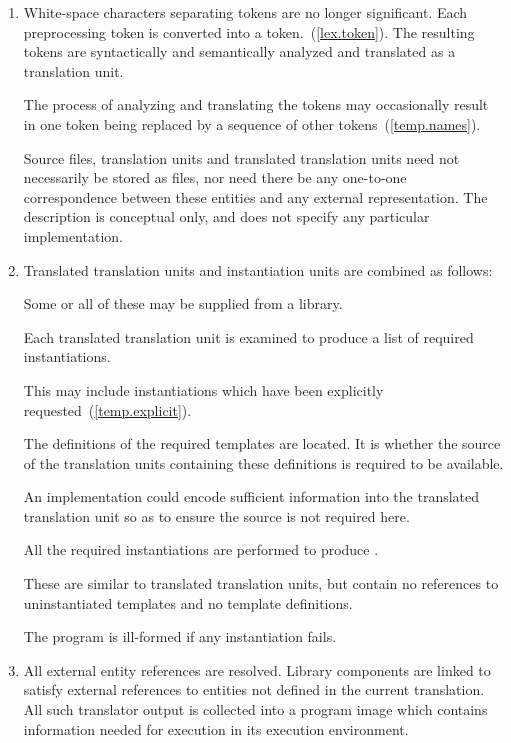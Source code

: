 \begin{enumerate}
\item White-space characters separating tokens are no longer
significant. Each preprocessing token is converted into a
token.~(\ref{lex.token}). The resulting tokens are syntactically and
semantically analyzed and translated as a translation unit. \begin{note}
The process of analyzing and translating the tokens may occasionally
result in one token being replaced by a sequence of other
tokens~(\ref{temp.names}).\end{note} \begin{note} Source files, translation
units and translated translation units need not necessarily be stored as
files, nor need there be any one-to-one correspondence between these
entities and any external representation. The description is conceptual
only, and does not specify any particular implementation. \end{note}

\item Translated translation units and instantiation units are combined
as follows: \begin{note} Some or all of these may be supplied from a
library. \end{note} Each translated translation unit is examined to
produce a list of required instantiations. \begin{note} This may include
instantiations which have been explicitly
requested~(\ref{temp.explicit}). \end{note} The definitions of the
required templates are located. It is  whether the
source of the translation units containing these definitions is required
to be available. \begin{note} An implementation could encode sufficient
information into the translated translation unit so as to ensure the
source is not required here. \end{note} All the required instantiations
are performed to produce
. \begin{note} These are similar
to translated translation units, but contain no references to
uninstantiated templates and no template definitions. \end{note} The
program is ill-formed if any instantiation fails.

\item All external entity references are resolved. Library
components are linked to satisfy external references to
entities not defined in the current translation. All such translator
output is collected into a program image which contains information
needed for execution in its execution environment.%
\end{enumerate}

